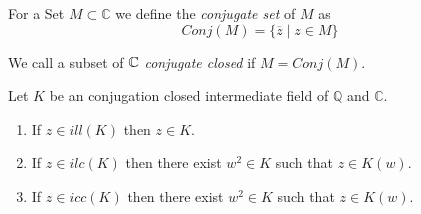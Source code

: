 \begin{frame}
    \begin{definition}
        \label{def:conj_set}
        \leanok
        For a Set $M \subset \mathbb{C}$ we define the \emph{conjugate set} of $M$ as 
        \begin{equation*}
            Conj(M) = \{\overline{z}\mid z\in M\}
        \end{equation*}
    \end{definition}
    
    \begin{definition}
        \label{def:conj_closed}
        \leanok
        We call a subset of $\mathbb{C}$ \emph{conjugate closed} if $M= Conj(M)$.
    \end{definition}
\end{frame}

\begin{frame}
    \begin{theorem}
        Let $K$ be an conjugation closed intermediate field of $\mathbb{Q}$ and $\mathbb{C}$.
        \begin{enumerate}
            \item If $z\in ill(K)$ then $z\in K$.
            \item If $z\in ilc(K)$ then there exist $w^2 \in K$ such that $z\in K(w)$.
            \item If $z\in icc(K)$ then there exist $w^2 \in K$ such that $z\in K(w)$.
        \end{enumerate}
    \end{theorem}
\end{frame}

